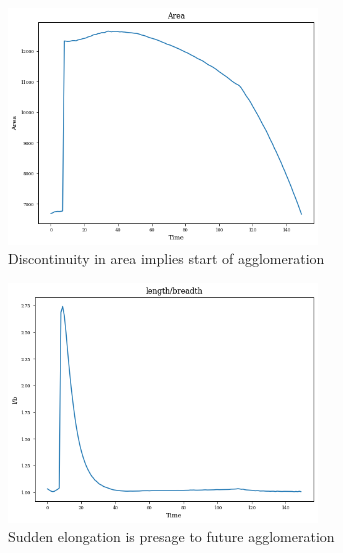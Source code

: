 \documentclass[12pt, a4paper]{report}
\begin{document}
\begin{figure}[H]
\centering
\begin{subfigure}{.45\textwidth}
  \centering
  \includegraphics[width=0.9\textwidth]{Pictures/Results/2area.jpeg}
  \caption{Discontinuity in area implies start of agglomeration}
  \label{img:microstrImg}
\end{subfigure}
\begin{subfigure}{.45\textwidth}
  \centering
  \includegraphics[width=0.9\textwidth]{Pictures/Results/2lb.png}
  \caption{Sudden elongation is presage to future agglomeration}
  \label{img:microstrImg}
\end{subfigure}
\begin{subfigure}{.45\textwidth}
  \centering

\end{subfigure}
\end{figure}
\end{document}
